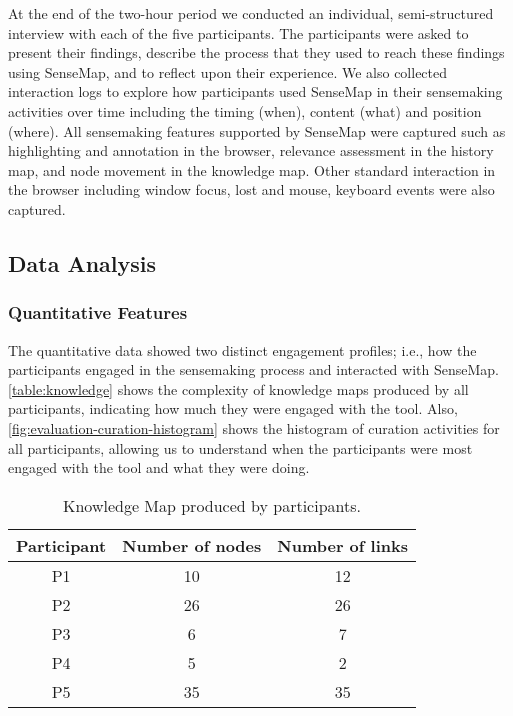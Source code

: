 At the end of the two-hour period we conducted an individual, semi-structured interview with each of the five participants. The participants were asked to present their findings, describe the process that they used to reach these findings using SenseMap, and to reflect upon their experience. We also collected interaction logs to explore how participants used SenseMap in their sensemaking activities over time including the timing (when), content (what) and position (where). All sensemaking features supported by SenseMap were captured such as highlighting and annotation in the browser, relevance assessment in the history map, and node movement in the knowledge map. Other standard interaction in the browser including window focus, lost and mouse, keyboard events were also captured.

\subsection{Data Analysis}

\subsubsection{Quantitative Features}
The quantitative data showed two distinct engagement profiles; i.e., how the participants engaged in the sensemaking process and interacted with SenseMap. \autoref{table:knowledge} shows the complexity of knowledge maps produced by all participants, indicating how much they were engaged with the tool. Also, \autoref{fig:evaluation-curation-histogram} shows the histogram of curation activities for all participants, allowing us to understand when the participants were most engaged with the tool and what they were doing.

\begin{table}
	\centering
	\sffamily\small
	\caption{Knowledge Map produced by participants.}
	\label{table:knowledge}
	\begin{tabular}{ccc}
		\toprule
		\textbf{Participant} & \textbf{Number of nodes} & \textbf{Number of links} \\
		\midrule
		P1 & 10 & 12 \\
		P2 & 26 & 26 \\
		P3 & 6 & 7 \\
		P4 & 5 & 2 \\
		P5 & 35 & 35 \\
		\bottomrule
	\end{tabular}
\end{table}

